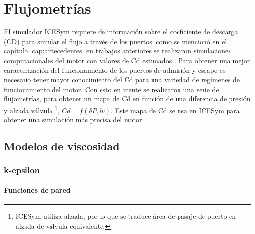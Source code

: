 \chapter{Flujometrías}
%
El simulador ICESym requiere de información sobre el coeficiente de descarga
(CD) para simular el flujo a través de los puertos, como se mencionó en el
capítulo \ref{cap:antecedentes} en trabajos anteriores se realizaron
simulaciones computacionales del motor con valores de Cd estimados
\cite{lopez13}.
%
Para obtener una mejor caracterización del funcionamiento de los puertos de
admisión y escape es necesario tener mayor conocimiento del Cd para una
variedad de regímenes de funcionamiento del motor.
%
Con esto en mente se realizaron una serie de flujometrías, para obtener un mapa
de Cd en función de una diferencia de presión y alzada válvula \footnote{ICESym
utiliza alzada, por lo que se traduce área de pasaje de puerto en alzada de
válvula equivalente.}, $Cd = f(\delta P,lv)$.
%
Este mapa de Cd se usa en ICESym para obtener una simulación más precisa del
motor.


\section{Modelos de viscosidad}
%

\subsection{k-epsilon}
\subsubsection{Funciones de pared}

